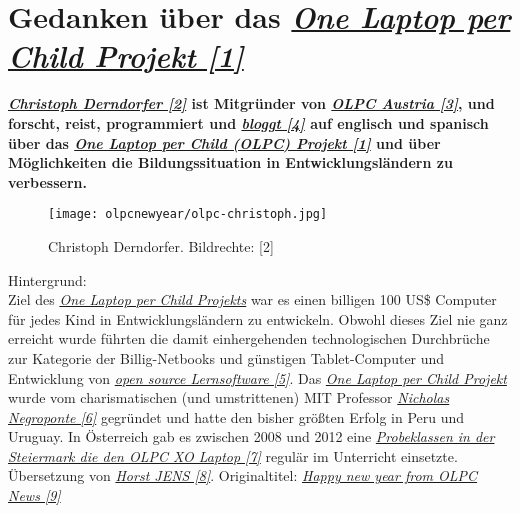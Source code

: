 \section*{Gedanken über das \href{http://one.laptop.org/}{\textit{One Laptop per Child Projekt [1]}}}
\hypertarget{olpcnewyear}{}
\label{olpcnewyear}

\textbf{\href{http://christoph-d.blogspot.co.at/}{\textit{Christoph Derndorfer [2]}} ist Mitgründer von \href{http://olpc.at/?setlang=de}{\textit{OLPC Austria [3]}}, und forscht, reist, programmiert und \href{http://www.olpcnews.com/}{\textit{bloggt [4]}} auf englisch und spanisch über das \href{http://one.laptop.org/}{\textit{One Laptop per Child (OLPC) Projekt [1]}} und über Möglichkeiten die Bildungssituation in Entwicklungsländern zu verbessern.} \\

\begin{figure}
\texttt{[image: olpcnewyear/olpc-christoph.jpg]} \\
\caption{Christoph Derndorfer. Bildrechte: [2]}
\end{figure}

Hintergrund: \\

Ziel des \href{http://one.laptop.org/}{\textit{One Laptop per Child Projekts}} war es einen billigen 100 US\$ Computer für jedes Kind in Entwicklungsländern zu entwickeln. Obwohl dieses Ziel nie ganz erreicht wurde führten die damit einhergehenden technologischen Durchbrüche zur Kategorie der Billig-Netbooks und günstigen Tablet-Computer und Entwicklung von \href{https://en.wikipedia.org/wiki/Sugar_(desktop_environment)}{\textit{open source Lernsoftware [5]}}. Das \href{http://one.laptop.org/}{\textit{One Laptop per Child Projekt}} wurde vom charismatischen (und umstrittenen) MIT Professor \href{https://de.wikipedia.org/wiki/Nicholas_Negroponte}{\textit{Nicholas Negroponte [6]}} gegründet und hatte den bisher größten Erfolg in Peru und Uruguay. In Österreich gab es zwischen 2008 und 2012 eine \href{http://www.fuzo-archiv.at/artikel/1503081v2}{\textit{Probeklassen in der Steiermark die den OLPC XO Laptop [7]}} regulär im Unterricht einsetzte. \\

Übersetzung von \href{http://spielend-programmieren.at}{\textit{Horst JENS [8]}}. Originaltitel: \href{http://www.olpcnews.com/commentary/olpc_news/happy_new_year_from_olpc_news.html}{\textit{Happy new year from OLPC News [9]}} \\


